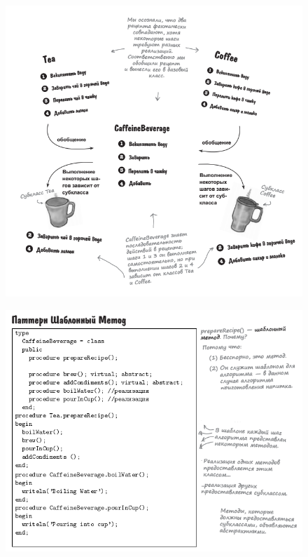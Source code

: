 \documentclass{beamer}
\begin{document}
\begin{frame}
\begin{figure}[h]
\centering
\includegraphics[scale=0.6]{images/lec12-pic09.png}
\label{pic-sort}
\end{figure}
\end{frame}

\begin{frame}
\begin{figure}[h]
\centering
\includegraphics[scale=0.5]{images/lec12-pic10.png}
\label{pic-sort}
\end{figure}
\end{frame}
\end{document}
